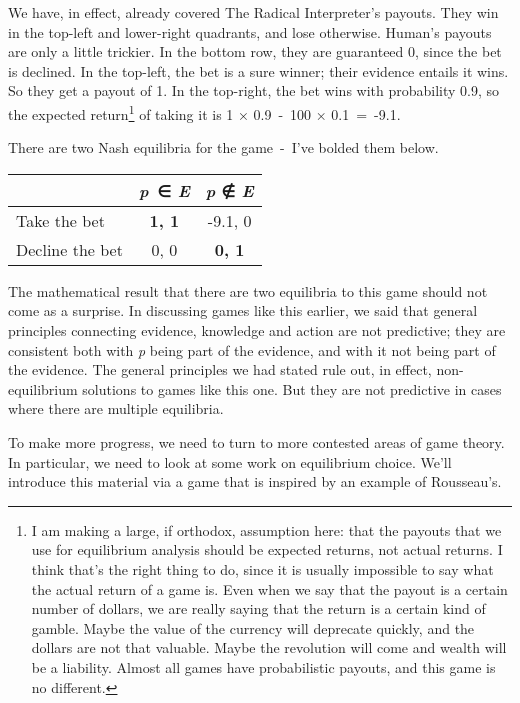 \documentclass[
  11pt,
  letterpaper,
  DIV=11,
  numbers=noendperiod,
  twoside]{scrartcl}
\begin{document}
We have, in effect, already covered The Radical Interpreter's payouts.
They win in the top-left and lower-right quadrants, and lose otherwise.
Human's payouts are only a little trickier. In the bottom row, they are
guaranteed 0, since the bet is declined. In the top-left, the bet is a
sure winner; their evidence entails it wins. So they get a payout of 1.
In the top-right, the bet wins with probability 0.9, so the expected
return\footnote{I am making a large, if orthodox, assumption here: that
  the payouts that we use for equilibrium analysis should be expected
  returns, not actual returns. I think that's the right thing to do,
  since it is usually impossible to say what the actual return of a game
  is. Even when we say that the payout is a certain number of dollars,
  we are really saying that the return is a certain kind of gamble.
  Maybe the value of the currency will deprecate quickly, and the
  dollars are not that valuable. Maybe the revolution will come and
  wealth will be a liability. Almost all games have probabilistic
  payouts, and this game is no different.} of taking it is 1 × 0.9~-~100
× 0.1~=~-9.1.

There are two Nash equilibria for the game~-~I've bolded them below.

\begin{longtable}[]{@{}lcc@{}}
\toprule\noalign{}
& \emph{p}~∈ \emph{E} & \emph{p} ∉ \emph{E} \\
\midrule\noalign{}
\endhead
\bottomrule\noalign{}
\endlastfoot
Take the bet & \textbf{1, 1} & -9.1, 0 \\
Decline the bet & 0, 0 & \textbf{0, 1} \\
\end{longtable}

The mathematical result that there are two equilibria to this game
should not come as a surprise. In discussing games like this earlier, we
said that general principles connecting evidence, knowledge and action
are not predictive; they are consistent both with \emph{p} being part of
the evidence, and with it not being part of the evidence. The general
principles we had stated rule out, in effect, non-equilibrium solutions
to games like this one. But they are not predictive in cases where there
are multiple equilibria.

To make more progress, we need to turn to more contested areas of game
theory. In particular, we need to look at some work on equilibrium
choice. We'll introduce this material via a game that is inspired by an
example of Rousseau's.
\end{document}
